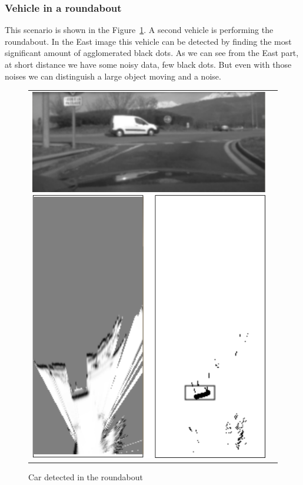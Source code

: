 \subsubsection{Vehicle in a roundabout}

This scenario is shown in the Figure~\ref{fig:result:scenetwocarrondepoint}. A second vehicle is performing the roundabout. In the East image this vehicle can be detected by finding the most significant amount of agglomerated black dots. As we can see from the East part, at short distance we have some noisy data, few black dots. But even with those noises we can distinguish a large object moving and a noise.

\begin{figure}[H]
   \centering
     \begin{tabular}{lr}
       \includegraphics[scale=0.60]{img/fig:result:scenetwocarrondepoint}
     \end{tabular}
   \caption{Car detected in the roundabout}
   \label{fig:result:scenetwocarrondepoint}
\end{figure}


